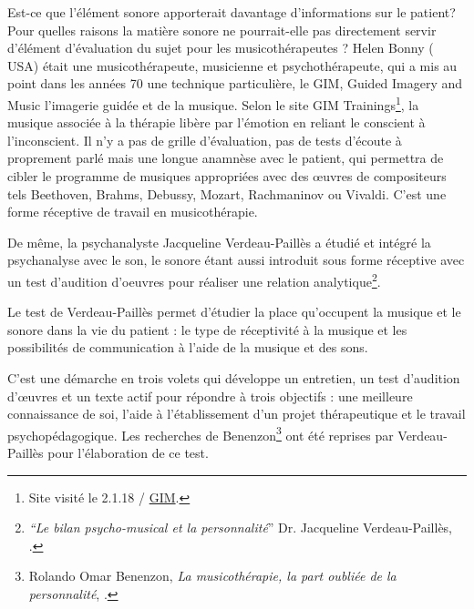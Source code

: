 Est-ce que l'élément sonore apporterait davantage d'informations sur
le patient? Pour quelles raisons la matière sonore ne pourrait-elle
pas directement servir d'élément d'évaluation du sujet pour les
musicothérapeutes ?  Helen Bonny ( USA) était une musicothérapeute,
musicienne et psychothérapeute, qui a mis au point dans les années 70
une technique particulière, le GIM, \og Guided Imagery and Music\fg
l'imagerie guidée et de la musique. Selon le site GIM
Trainings\footnote{Site visité le 2.1.18 / \href{\#gimsite}{GIM}.}, la
musique associée à la thérapie libère par l'émotion en reliant le
conscient à l'inconscient. Il n'y a pas de grille d'évaluation, pas de
tests d'écoute à proprement parlé mais une longue anamnèse avec le
patient, qui permettra de cibler le programme de musiques appropriées
avec des \oe uvres de compositeurs tels Beethoven, Brahms, Debussy,
Mozart, Rachmaninov ou Vivaldi. C'est une forme réceptive de travail
en musicothérapie.

De même, la psychanalyste Jacqueline Verdeau-Paillès a étudié et
intégré la psychanalyse avec le son, le sonore étant aussi introduit
sous forme réceptive avec un test d'audition d'oeuvres pour réaliser
une relation analytique\footnote{\emph{``Le bilan psycho-musical et la
    personnalité}'' Dr. Jacqueline Verdeau-Paillès,
  \cite{verdeau-pailles}.}.

Le test de Verdeau-Paillès permet d'étudier la place qu'occupent la
musique et le sonore dans la vie du patient : le type de réceptivité à
la musique et les possibilités de communication à l'aide de la musique
et des sons.

C'est une démarche en trois volets qui développe un
entretien, un test d'audition d'\oe uvres et un texte actif pour
répondre à trois objectifs : une meilleure connaissance de soi, l'aide
à l'établissement d'un projet thérapeutique et le travail
psychopédagogique. Les recherches de Benenzon\footnote{Rolando Omar
  Benenzon, \emph{La musicothérapie, la part oubliée de la
    personnalité}, \cite{Benenzon2007}.} ont été reprises par
Verdeau-Paillès pour l'élaboration de ce test.

